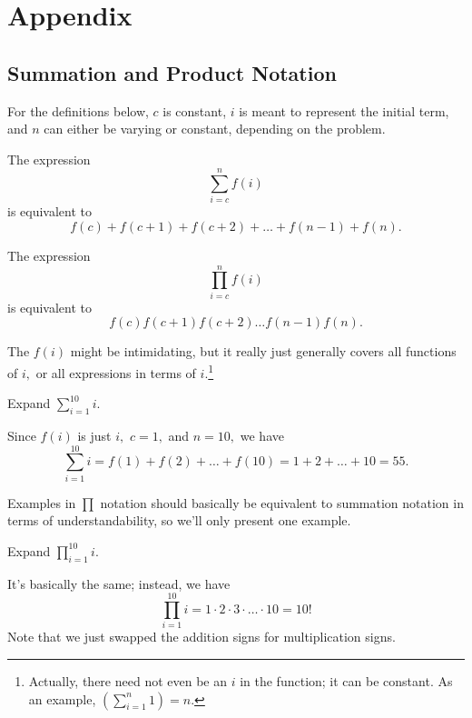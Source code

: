 \documentclass[blue,onecol]{shooting}
\begin{document}
\pagebreak

\section{Appendix}

\subsection{Summation and Product Notation}

For the definitions below, $c$ is constant, $i$ is meant to represent the initial term, and $n$ can either be varying or constant, depending on the problem.

\begin{defi}
The expression $$\sum\limits_{i=c}^n f(i)$$ is equivalent to $$f(c)+f(c+1)+f(c+2)+\dots+f(n-1)+f(n).$$
\end{defi}

\begin{defi}
The expression $$\prod\limits_{i=c}^n f(i)$$ is equivalent to $$f(c)f(c+1)f(c+2)\dots f(n-1)f(n).$$
\end{defi}

The $f(i)$ might be intimidating, but it really just generally covers all functions of $i,$ or all expressions in terms of $i.$\footnote{Actually, there need not even be an $i$ in the function; it can be constant. As an example, $\left(\sum\limits_{i=1}^n 1\right)=n.$}

\begin{exam}
Expand $\sum\limits_{i=1}^{10} i.$
\end{exam}

\begin{sol}
Since $f(i)$ is just $i,$ $c=1,$ and $n=10,$ we have $$\sum\limits_{i=1}^{10}i=f(1)+f(2)+\dots+f(10)=1+2+\dots+10=55.$$
\end{sol}

Examples in $\prod\limits$ notation should basically be equivalent to summation notation in terms of understandability, so we'll only present one example.

\begin{exam}
Expand $\prod\limits_{i=1}^{10} i.$
\end{exam}

\begin{sol}
It's basically the same; instead, we have $$\prod\limits_{i=1}^{10} i=1\cdot 2\cdot 3\cdot \dots \cdot 10=10!$$ Note that we just swapped the addition signs for multiplication signs.
\end{sol}
\end{document}
